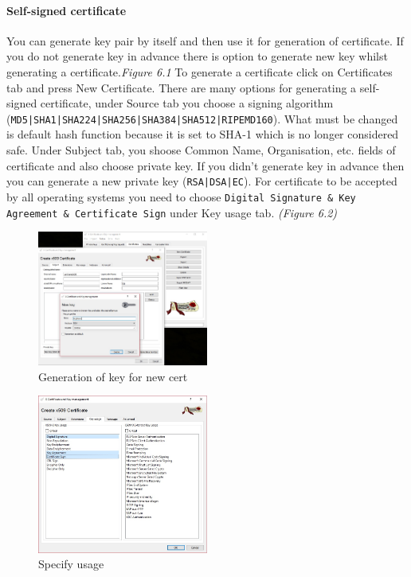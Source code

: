 \documentclass[10pt, a4paper]{report}
\begin{document}
{      \paragraph{Self-signed certificate}
You can generate key pair by itself and then use it for generation of certificate. If you do not generate key in advance there is option to generate new key whilst generating a certificate.\textit{{Figure 6.1}} To generate a certificate click on Certificates tab and press New Certificate. There are many options for generating a self-signed certificate, under Source tab you choose a signing algorithm (\verb+MD5|SHA1|SHA224|SHA256|SHA384|SHA512|RIPEMD160+). What must be changed is default hash function because it is set to SHA-1 which is no longer considered safe. Under Subject tab, you shoose Common Name, Organisation, etc. fields of certificate and also choose private key. If you didn't generate key in advance then you can generate a new private key (\verb+RSA|DSA|EC+). For certificate to be accepted by all operating systems you need to choose \verb+Digital Signature & Key Agreement & Certificate Sign+ under Key usage tab. \textit{(Figure 6.2)}
\begin{figure}[!ht]
 \caption{Generation of key for new cert}
 \centering
  \includegraphics[width=0.5\textwidth]{../Dependancies/XCA/genKey.jpg}
\end{figure}

\begin{figure}[!ht]
 \caption{Specify usage}
 \centering
  \includegraphics[width=0.5\textwidth]{../Dependancies/XCA/genKey_specif.jpg}
\end{figure}


}
\end{document}
